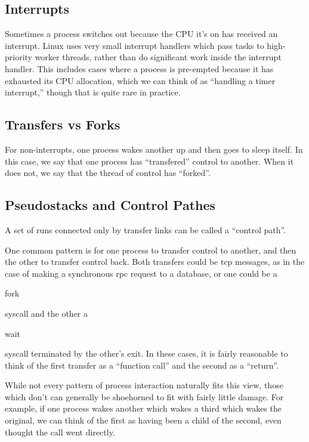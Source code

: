 \documentclass[10pt]{article}
\begin{document}
\subsection{Interrupts}

Sometimes a process switches out because the CPU it's on has received an interrupt.  Linux uses very small interrupt handlers which pass tasks to high-priority worker threads, rather than do significant work inside the interrupt handler.  This includes cases where a process is pre-empted because it has exhausted its CPU allocation, which we can think of as ``handling a timer interrupt,'' though that is quite rare in practice.

\subsection{Transfers vs Forks}

For non-interrupts, one process wakes another up and then goes to sleep itself.  In this case, we say that one process has ``transfered'' control to another.  When it does not, we say that the thread of control has ``forked''.

\subsection{Pseudostacks and Control Pathes}

A set of runs connected only by transfer links can be called a ``control path''.

One common pattern is for one process to transfer control to another, and then the other to transfer control back.  Both transfers could be tcp messages, as in the case of making a synchronous rpc request to a database, or one could be a \begin{tt}fork\end{tt} syscall and the other a \begin{tt}wait\end{tt} syscall terminated by the other's exit.  In these cases, it is fairly reasonable to think of the first transfer as a ``function call'' and the second as a ``return''.

While not every pattern of process interaction naturally fits this view, those which don't can generally be shoehorned to fit with fairly little damage.  For example, if one process wakes another which wakes a third which wakes the original, we can think of the first as having been a child of the second, even thought the call went directly.
\end{document}
